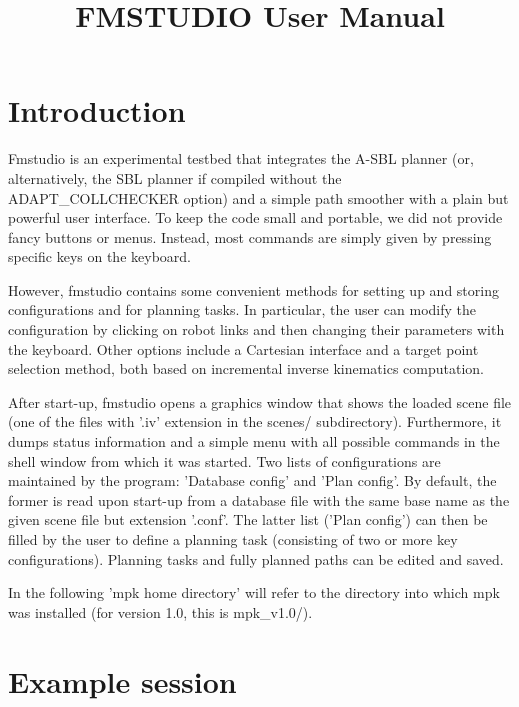 \documentclass[letter,12pt]{article}
\begin{document}
\title{FMSTUDIO User Manual}
\maketitle

\section{Introduction}
\label{sec:intro}

Fmstudio is an experimental testbed that integrates the A-SBL planner
(or, alternatively, the SBL planner if compiled without the
ADAPT_COLLCHECKER option) and a simple path smoother with a plain but
powerful user interface.  To keep the code small and portable, we did
not provide fancy buttons or menus.  Instead, most commands are simply
given by pressing specific keys on the keyboard.

However, fmstudio contains some convenient methods for setting up and
storing configurations and for planning tasks.  In particular, the
user can modify the configuration by clicking on robot links and
then changing their parameters with the keyboard.  Other options include a
Cartesian interface and a target point selection method, both based on
incremental inverse kinematics computation.

After start-up, fmstudio opens a graphics window that shows the loaded
scene file (one of the files with '.iv' extension in the scenes/
subdirectory).  Furthermore, it dumps status information and a simple
menu with all possible commands in the shell window from which it was
started.  Two lists of configurations are maintained by the program:
'Database config' and 'Plan config'.  By default, the former is read
upon start-up from a database file with the same base name as the
given scene file but extension '.conf'.  The latter list ('Plan
config') can then be filled by the user to define a planning task
(consisting of two or more key configurations).  Planning tasks and
fully planned paths can be edited and saved.

In the following 'mpk home directory' will refer to the directory into
which mpk was installed (for version 1.0, this is mpk\_v1.0/).


\section{Example session}
\label{sec:example_session}
\end{document}
